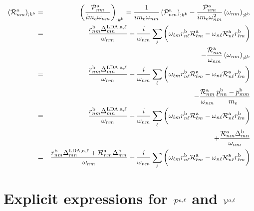 \documentclass[floatfix,prb,aps,superscriptaddress,11pt,preprint]{revtex4}
\begin{document}
\begin{eqnarray}\label{a_rgendevnnn}
({\cal R}^{\mathrm{a}}_{nm})_{;k^{\mathrm{b}}}&=&\left(\frac{{\cal P}^{\mathrm{a}}_{nm}}{im_e\omega_{nm}}\right)_{;k^{\mathrm{b}}}
=
\frac{1}
{im_e\omega_{nm}}
\left(
{\cal P}^{\mathrm{a}}_{nm}
\right)_{;k^{\mathrm{b}}}
-
\frac{{\cal P}^{\mathrm{a}}_{nm}}
{im_e\omega^2_{nm}}
\left(
\omega_{nm}
\right)_{;k^{\mathrm{b}}}
\nonumber \\
&=&
\frac{r^{\mathrm{b}}_{nm}
\Delta^{\mathrm{LDA},\mathrm{a},\ell}_{mn}}
{\omega_{nm}}
+
\frac{i}{\omega_{nm}}
\sum_{\ell}
\bigg(
\omega_{\ell m}
r^{\mathrm{b}}_{n\ell}
{\cal R}^{\mathrm{a}}_{\ell m}
-
\omega_{n\ell}
{\cal R}^{\mathrm{a}}_{n\ell}
r^{\mathrm{b}}_{\ell m}
\bigg)
\nonumber \\
&&
-
\frac{{\cal R}^{\mathrm{a}}_{nm}}
{\omega_{nm}}
\left(
\omega_{nm}
\right)_{;k^{\mathrm{b}}}
\nonumber \\
&=&
\frac{r^{\mathrm{b}}_{nm}
\Delta^{\mathrm{LDA},\mathrm{a},\ell}_{mn}}
{\omega_{nm}}
+
\frac{i}{\omega_{nm}}
\sum_{\ell}
\bigg(
\omega_{\ell m}
r^{\mathrm{b}}_{n\ell}
{\cal R}^{\mathrm{a}}_{\ell m}
-
\omega_{n\ell}
{\cal R}^{\mathrm{a}}_{n\ell}
r^{\mathrm{b}}_{\ell m}
\bigg)
\nonumber \\
&&
-
\frac{{\cal R}^{\mathrm{a}}_{nm}}
{\omega_{nm}}
\frac{p^{\mathrm{b}}_{nn}-p^{\mathrm{b}}_{mm}}{m_e}
\nonumber \\
&=&
\frac{r^{\mathrm{b}}_{nm}
\Delta^{\mathrm{LDA},\mathrm{a},\ell}_{mn}}
{\omega_{nm}}
+
\frac{i}{\omega_{nm}}
\sum_{\ell}
\bigg(
\omega_{\ell m}
r^{\mathrm{b}}_{n\ell}
{\cal R}^{\mathrm{a}}_{\ell m}
-
\omega_{n\ell}
{\cal R}^{\mathrm{a}}_{n\ell}
r^{\mathrm{b}}_{\ell m}
\bigg)
\nonumber \\
&&
+
\frac{
{\cal R}^{\mathrm{a}}_{nm}\Delta^{\mathrm{b}}_{mn}
}
{\omega_{nm}}
\nonumber \\
&=&
\frac{r^{\mathrm{b}}_{nm}
\Delta^{\mathrm{LDA},\mathrm{a},\ell}_{mn}
+
{\cal R}^{\mathrm{a}}_{nm}\Delta^{\mathrm{b}}_{mn}
}
{\omega_{nm}}
+
\frac{i}{\omega_{nm}}
\sum_{\ell}
\bigg(
\omega_{\ell m}
r^{\mathrm{b}}_{n\ell}
{\cal R}^{\mathrm{a}}_{\ell m}
-
\omega_{n\ell}
{\cal R}^{\mathrm{a}}_{n\ell}
r^{\mathrm{b}}_{\ell m}
\bigg)
\end{eqnarray}

\section{Explicit expressions for ${\cal P}^{a,\ell}$
and ${\cal V}^{a,\ell}$
}\label{pw}%
\end{document}
